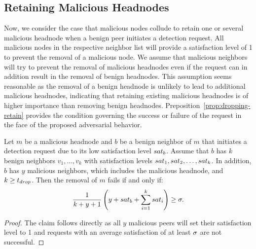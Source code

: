 \subsection{Retaining Malicious Headnodes}
Now, we consider the case that malicious nodes collude to retain one or several malicious headnode when a benign peer initiates a detection request. 
All malicious nodes in the respective neighbor list will provide a satisfaction level of 1 to prevent the removal of a malicious node. We assume that malicious neighbors will try to prevent the removal of malicious headnodes even if the request can in addition result in the removal of benign headnodes. This assumption seems reasonable as the removal of a benign headnode is unlikely to lead to additional malicious headnodes, indicating that retaining existing malicious headnodes is of higher importance than removing benign headnodes.  Preposition~\ref{prop:dropping-retain} provides the condition governing the success or failure of the \drop request in the face of the proposed adversarial behavior. 

\begin{proposition}
\label{prop:dropping-retain}
Let $m$ be a malicious headnode and $b$ be a benign neighbor of $m$ that initiates a detection request due to its low satisfaction level $sat_b$.
Assume that $b$ has $k$ benign neighbors $v_1, \ldots , v_k$ with satisfaction levels $sat_1, sat_2 ,\ldots  , sat_k$. In addition, $b$ has $y$ malicious neighbors, which includes the malicious headnode, and $k\geq t_{drop}$.
 Then the removal of $m$ fails if and only if: 
\begin{align}
\label{eq:drop-retain}
\frac{1}{k+y+1}\left(y+\sat_b + \sum_{i=1}^k \sat_i\right) \geq \satThres.  
\end{align} 
\end{proposition}
\begin{proof}
The claim follows directly as all $y$ malicious peers will set their satisfaction level to 1 and \drop requests with an average satisfaction of at least $\sigma$ are not successful.   
\end{proof}


 
